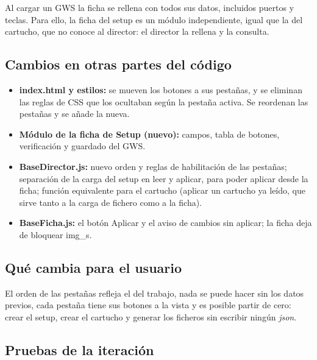 Al cargar un GWS la ficha se rellena con todos sus datos, incluidos puertos y teclas. Para ello, la ficha del setup es un módulo independiente, igual que la del cartucho, que no conoce al director: el director la rellena y la consulta.

\subsection{Cambios en otras partes del código}
\label{sec:F5I12Codigo}

\begin{itemize}
	\item \textbf{index.html y estilos:} se mueven los botones a sus pestañas, y se eliminan las reglas de CSS que los ocultaban según la pestaña activa. Se reordenan las pestañas y se añade la nueva.
	\item \textbf{Módulo de la ficha de Setup (nuevo):} campos, tabla de botones, verificación y guardado del GWS.
	\item \textbf{BaseDirector.js:} nuevo orden y reglas de habilitación de las pestañas; separación de la carga del setup en leer y aplicar, para poder aplicar desde la ficha; función equivalente para el cartucho (aplicar un cartucho ya leído, que sirve tanto a la carga de fichero como a la ficha).
	\item \textbf{BaseFicha.js:} el botón Aplicar y el aviso de cambios sin aplicar; la ficha deja de bloquear img\_s.
\end{itemize}

\subsection{Qué cambia para el usuario}
\label{sec:F5I12Usuario}

El orden de las pestañas refleja el del trabajo, nada se puede hacer sin los datos previos, cada pestaña tiene sus botones a la vista y es posible partir de cero: crear el setup, crear el cartucho y generar los ficheros sin escribir ningún \emph{json}.

\subsection{Pruebas de la iteración}
\label{sec:F5I12Pruebas}

